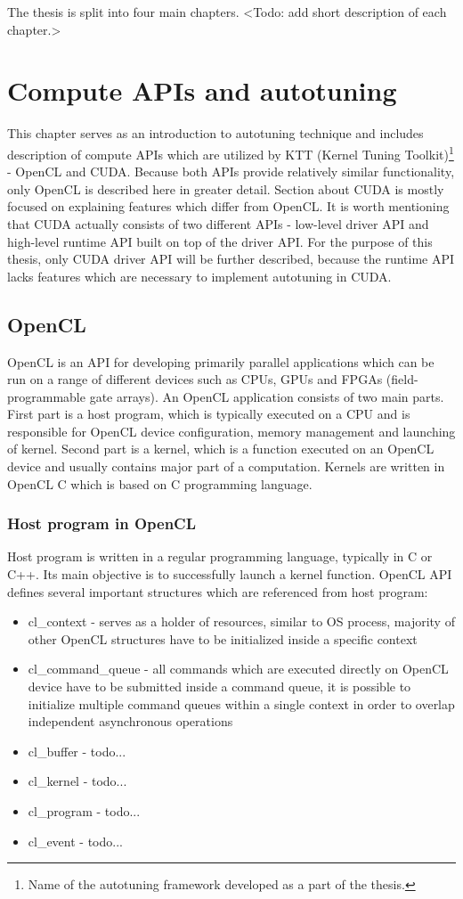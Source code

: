\documentclass
[
    digital, %
    oneside, %
    table, %
    nolof, %
    nolot, %
    nocover %
]{fithesis3}
\begin{document}
The thesis is split into four main chapters. <Todo: add short description of each chapter.>

\chapter{Compute APIs and autotuning}
This chapter serves as an introduction to autotuning technique and includes description of compute APIs which are utilized by KTT (Kernel Tuning
Toolkit)\footnote{Name of the autotuning framework developed as a part of the thesis.} - OpenCL and CUDA. Because both APIs provide relatively similar
functionality, only OpenCL is described here in greater detail. Section about CUDA is mostly focused on explaining features which differ from OpenCL.
It is worth mentioning that CUDA actually consists of two different APIs - low-level driver API and high-level runtime API built on top of the driver
API. For the purpose of this thesis, only CUDA driver API will be further described, because the runtime API lacks features which are necessary to
implement autotuning in CUDA.

\section{OpenCL}
OpenCL is an API for developing primarily parallel applications which can be run on a range of different devices such as CPUs, GPUs and FPGAs
(field-programmable gate arrays). An OpenCL application consists of two main parts. First part is a host program, which is typically executed on a CPU
and is responsible for OpenCL device configuration, memory management and launching of kernel. Second part is a kernel, which is a function executed
on an OpenCL device and usually contains major part of a computation. Kernels are written in OpenCL C which is based on C programming language.

\subsection{Host program in OpenCL}
Host program is written in a regular programming language, typically in C or C++. Its main objective is to successfully launch a kernel function.
OpenCL API defines several important structures which are referenced from host program:
\begin{itemize}
    \item cl\_context - serves as a holder of resources, similar to OS process, majority of other OpenCL structures have to be initialized inside a
    specific context
    \item cl\_command\_queue - all commands which are executed directly on OpenCL device have to be submitted inside a command queue, it is possible
    to initialize multiple command queues within a single context in order to overlap independent asynchronous operations
    \item cl\_buffer - todo...
    \item cl\_kernel - todo...
    \item cl\_program - todo...
    \item cl\_event - todo...
\end{itemize}
\end{document}
